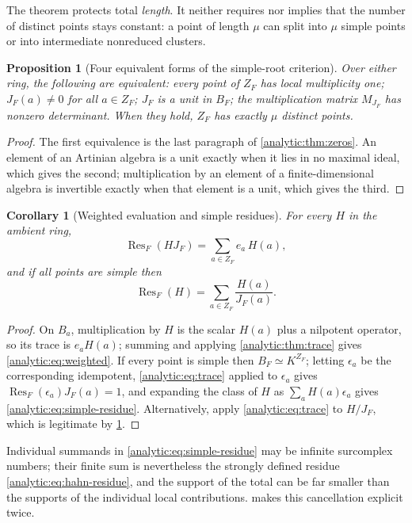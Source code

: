 \documentclass[11pt,letterpaper]{article}
\newtheorem{proposition}[theorem]{Proposition}
\newtheorem{corollary}[theorem]{Corollary}
\theoremstyle{definition}
\theoremstyle{remark}
\newcommand{\Res}{\operatorname{Res}}
\numberwithin{equation}{section}
\begin{document}
The theorem protects total \emph{length}. It neither requires nor implies
that the number of distinct points stays constant: a point of length $\mu$
can split into $\mu$ simple points or into intermediate nonreduced clusters.

\begin{proposition}[Four equivalent forms of the simple-root criterion]
\label{analytic:prop:jacobian}
Over either ring, the following are equivalent: every point of $Z_F$ has
local multiplicity one; $J_F(a)\ne0$ for all $a\in Z_F$; $J_F$ is a unit in
$B_F$; the multiplication matrix $M_{J_F}$ has nonzero determinant. When
they hold, $Z_F$ has exactly $\mu$ distinct points.
\end{proposition}
\begin{proof}
The first equivalence is the last paragraph of
\cref{analytic:thm:zeros}. An element of an Artinian algebra is a unit
exactly when it lies in no maximal ideal, which gives the second;
multiplication by an element of a finite-dimensional algebra is invertible
exactly when that element is a unit, which gives the third.
\end{proof}

\begin{corollary}[Weighted evaluation and simple residues]
\label{analytic:cor:weighted}
For every $H$ in the ambient ring,
\begin{equation}\label{analytic:eq:weighted}
 \Res_F(HJ_F)=\sum_{a\in Z_F}e_a\,H(a),
\end{equation}
and if all points are simple then
\begin{equation}\label{analytic:eq:simple-residue}
 \Res_F(H)=\sum_{a\in Z_F}\frac{H(a)}{J_F(a)} .
\end{equation}
\end{corollary}
\begin{proof}
On $B_a$, multiplication by $H$ is the scalar $H(a)$ plus a nilpotent
operator, so its trace is $e_aH(a)$; summing and applying
\cref{analytic:thm:trace} gives \eqref{analytic:eq:weighted}. If every point
is simple then $B_F\simeq K^{Z_F}$; letting $\epsilon_a$ be the
corresponding idempotent, \eqref{analytic:eq:trace} applied to
$\epsilon_a$ gives $\Res_F(\epsilon_a)J_F(a)=1$, and expanding the class of
$H$ as $\sum_aH(a)\epsilon_a$ gives
\eqref{analytic:eq:simple-residue}. Alternatively, apply
\eqref{analytic:eq:trace} to $H/J_F$, which is legitimate by
\cref{analytic:prop:jacobian}.
\end{proof}

Individual summands in \eqref{analytic:eq:simple-residue} may be infinite
surcomplex numbers; their finite sum is nevertheless the strongly defined
residue \eqref{analytic:eq:hahn-residue}, and the support of the total can
be far smaller than the supports of the individual local contributions.
 makes this cancellation explicit twice.
\end{document}
